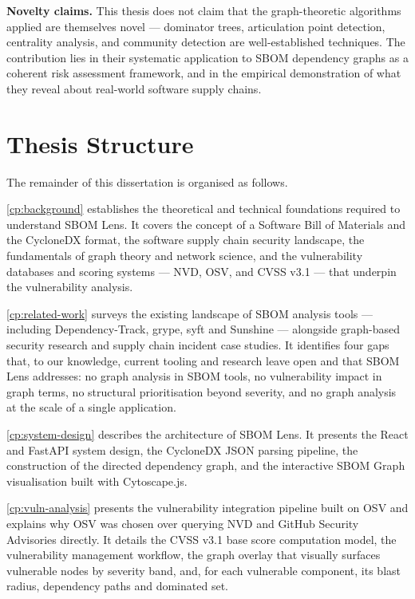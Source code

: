 \textbf{Novelty claims.} This thesis does not claim that the graph-theoretic algorithms applied are themselves novel --- dominator trees, articulation point detection, centrality analysis, and community detection are well-established techniques. The contribution lies in their systematic application to SBOM dependency graphs as a coherent risk assessment framework, and in the empirical demonstration of what they reveal about real-world software supply chains.


\section{Thesis Structure}
\label{sec:structure}

The remainder of this dissertation is organised as follows.

\autoref{cp:background} establishes the theoretical and technical foundations required to understand SBOM Lens. It covers the concept of a Software Bill of Materials and the CycloneDX format, the software supply chain security landscape, the fundamentals of graph theory and network science, and the vulnerability databases and scoring systems --- NVD, OSV, and CVSS v3.1 --- that underpin the vulnerability analysis.

\autoref{cp:related-work} surveys the existing landscape of SBOM analysis tools --- including Dependency-Track, grype, syft and Sunshine --- alongside graph-based security research and supply chain incident case studies. It identifies four gaps that, to our knowledge, current tooling and research leave open and that SBOM Lens addresses: no graph analysis in SBOM tools, no vulnerability impact in graph terms, no structural prioritisation beyond severity, and no graph analysis at the scale of a single application.

\autoref{cp:system-design} describes the architecture of SBOM Lens. It presents the React and FastAPI system design, the CycloneDX JSON parsing pipeline, the construction of the directed dependency graph, and the interactive SBOM Graph visualisation built with Cytoscape.js.

\autoref{cp:vuln-analysis} presents the vulnerability integration pipeline built on OSV and explains why OSV was chosen over querying NVD and GitHub Security Advisories directly. It details the CVSS v3.1 base score computation model, the vulnerability management workflow, the graph overlay that visually surfaces vulnerable nodes by severity band, and, for each vulnerable component, its blast radius, dependency paths and dominated set.

